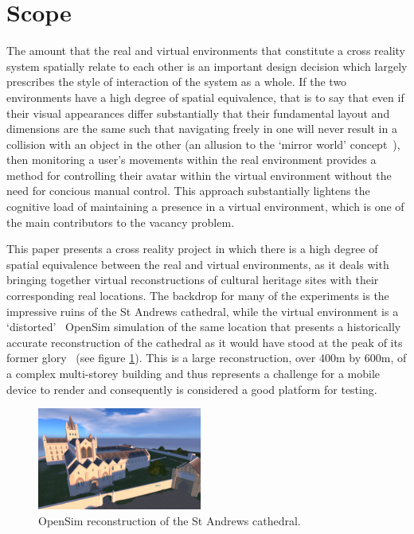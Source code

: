 \section{Scope}
The amount that the real and virtual environments that constitute a cross reality system spatially relate to each other is an important design decision which largely prescribes the style of interaction of the system as a whole. If the two environments have a high degree of spatial equivalence, that is to say that even if their visual appearances differ substantially that their fundamental layout and dimensions are the same such that navigating freely in one will never result in a collision with an object in the other (an allusion to the `mirror world' concept~\cite{Gelernter1993, Bar-Zeev2007, Roush2007}), then monitoring a user's movements within the real environment provides a method for controlling their avatar within the virtual environment without the need for concious manual control. This approach substantially lightens the cognitive load of maintaining a presence in a virtual environment, which is one of the main contributors to the vacancy problem.

This paper presents a cross reality project in which there is a high degree of spatial equivalence between the real and virtual environments, as it deals with bringing together virtual reconstructions of cultural heritage sites with their corresponding real locations. The backdrop for many of the experiments is the impressive ruins of the St Andrews cathedral, while the virtual environment is a `distorted'~\cite{lifton:merging} OpenSim simulation of the same location that presents a historically accurate reconstruction of the cathedral as it would have stood at the peak of its former glory~\cite{Kennedy2012, OpenVirtualWorldsgroupSchoolofComputerScience} (see figure \ref{cathedral_picture}). This is a large reconstruction, over 400m by 600m, of a complex multi-storey building and thus represents a challenge for a mobile device to render and consequently is considered a good platform for testing.

\begin{figure}[h]
\centering
\includegraphics[width=0.48\textwidth]{images/figure_1}
\caption{OpenSim reconstruction of the St Andrews cathedral.}
\label{cathedral_picture}
\end{figure}

